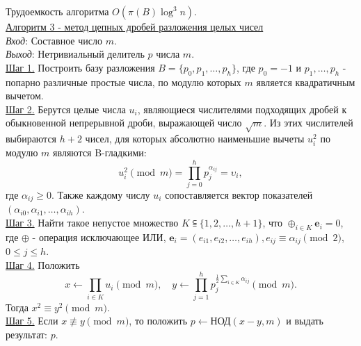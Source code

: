 \documentclass[bachelor, och, labwork]{shiza}
\begin{document}
            Трудоемкость алгоритма $O(\pi(B)\log^3 n)$.\\


        \underline{Алгоритм 3 - метод цепных дробей разложения целых чисел}\\
            \textit{Вход}: Составное число $m$.\\
            \textit{Выход}: Нетривиальный делитель $p$ числа $m$.\\
            \underline{Шаг 1.} Построить базу разложения $B=\{p_{0},p_{1},\dots
            ,p_{h}\}$, где $p_{0}=-1$ и $p_{1},\dots ,p_{h}$ - попарно различные
            простые числа, по модулю которых $m$ является квадратичным
            вычетом.\\
            \underline{Шаг 2.} Берутся целые числа $u_{i}$, являющиеся
            числителями подходящих дробей к обыкновенной непрерывной дроби,
            выражающей число $\sqrt{m}$. Из этих числителей выбираются $h+2$
            чисел, для которых абсолютно наименьшие вычеты $u_{i}^{2}$ по модулю
            $m$ являются B-гладкими:$$u_{i}^{2}{\pmod {m}}=\prod
            _{j=0}^{h}p_{j}^{\alpha _{ij}}=\upsilon _{i},$$ где $\alpha
            _{ij}\geqslant 0$. Также каждому числу $u_{i}$ сопоставляется вектор
            показателей\\ $(\alpha _{i0},\alpha _{i1},\dots ,\alpha _{ih})$.\\
            \underline{Шаг 3.} Найти такое непустое множество $K\subseteqq
            \{1,2,\dots ,h+1\}$, что $\oplus _{i\in K}\mathbf {e}_{i} = 0$, где
            $\oplus$ - операция исключающее ИЛИ, $\mathbf {e}
            _{i}=(e_{i1},e_{i2},\dots ,e_{ih}),e_{ij}\equiv \alpha _{ij}{\pmod
            {2}}$, $0\leqslant j\leqslant h$.\\
            \underline{Шаг 4.} Положить $$x \leftarrow \prod _{i\in K}u_{i}{\pmod
            {m}},\quad y\leftarrow \prod _{j=1}^{h}p_{j}^{{\frac {1}{2}}\sum
            _{i\in K}\alpha _{ij}}{\pmod {m}}.$$ Тогда $x^{2}\equiv y^{2}{\pmod
            {m}}$.\\
            \underline{Шаг 5.} Если $x\not \equiv y{\pmod {m}}$, то положить
            $p\leftarrow \text{НОД}(x - y, m)$ и выдать результат: $p$.\\
\end{document}
